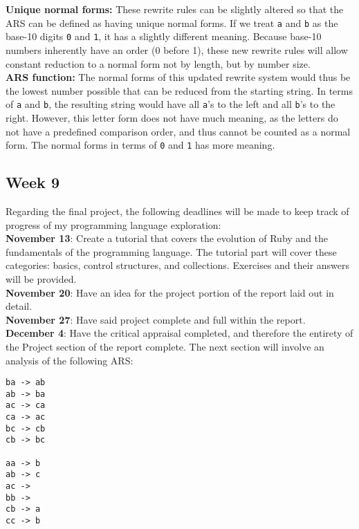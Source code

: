 \documentclass{article}
\theoremstyle{theorem}
\theoremstyle{definition}
\theoremstyle{remark}
\begin{document}
\noindent \textbf{Unique normal forms: } These rewrite rules can be slightly altered so that the ARS can be defined as having unique normal forms. If we treat \texttt{a} and \texttt{b} as the base-10 digits \texttt{0} and \texttt{1}, it has a slightly different meaning. Because base-10 numbers inherently have an order (0 before 1), these new rewrite rules will allow constant reduction to a normal form not by length, but by number size.\\

\noindent \textbf{ARS function: } The normal forms of this updated rewrite system would thus be the lowest number possible that can be reduced from the starting string. In terms of \texttt{a} and \texttt{b}, the resulting string would have all \texttt{a}'s to the left and all \texttt{b}'s to the right. However, this letter form does not have much meaning, as the letters do not have a predefined comparison order, and thus cannot be counted as a normal form. The normal forms in terms of \texttt{0} and \texttt{1} has more meaning.
\subsection{Week 9}
Regarding the final project, the following deadlines will be made to keep track of progress of my programming language exploration:\\

\noindent \textbf{November 13}: Create a tutorial that covers the evolution of Ruby and the fundamentals of the programming language. The tutorial part will cover these categories: basics, control structures, and collections. Exercises and their answers will be provided.\\

\noindent \textbf{November 20}: Have an idea for the project portion of the report laid out in detail.\\

\noindent \textbf{November 27}: Have said project complete and full within the report.\\

\noindent \textbf{December 4}: Have the critical appraisal completed, and therefore the entirety of the Project section of the report complete.
\newpage
\noindent The next section will involve an analysis of the following ARS:
\begin{lstlisting}
ba -> ab
ab -> ba
ac -> ca
ca -> ac
bc -> cb
cb -> bc
 
aa -> b
ab -> c
ac ->  
bb ->
cb -> a
cc -> b
\end{lstlisting}
\end{document}
